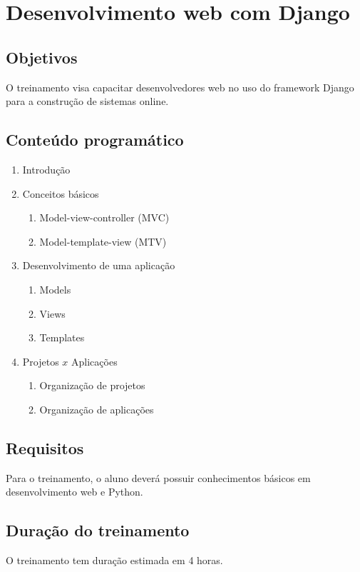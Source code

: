 %
%

\section{Desenvolvimento web com Django}
\label{sec:django}

\subsection{Objetivos}
O treinamento visa capacitar desenvolvedores web no uso do framework
Django para a construção de sistemas online.

\subsection{Conteúdo programático}
\begin{enumerate}
\item Introdução
\item Conceitos básicos
  \begin{enumerate}
  \item Model-view-controller (MVC)
  \item Model-template-view (MTV)
  \end{enumerate}
\item Desenvolvimento de uma aplicação
  \begin{enumerate}
  \item Models
  \item Views
  \item Templates
  \end{enumerate}
\item Projetos $x$ Aplicações
  \begin{enumerate}
  \item Organização de projetos
  \item Organização de aplicações
  \end{enumerate}
\end{enumerate}

\subsection{Requisitos}
Para o treinamento, o aluno deverá possuir conhecimentos básicos em
desenvolvimento web e Python.

\subsection{Duração do treinamento}
O treinamento tem duração estimada em 4 horas.

%
%
